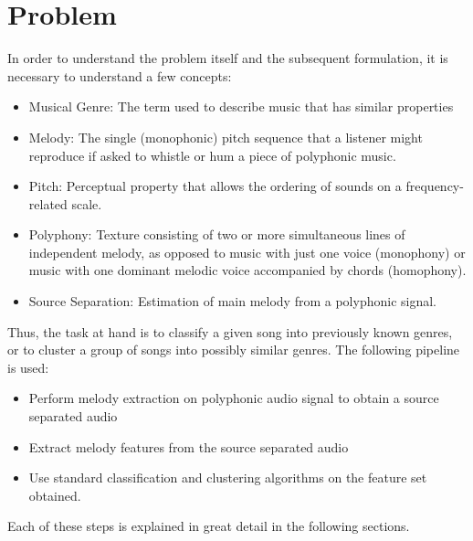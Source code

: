 \documentclass[12pt,journal,compsoc]{IEEEtran}
\begin{document}
\section{Problem}

In order to understand the problem itself and the subsequent formulation, it is necessary to understand a few concepts:
\begin{itemize}
\item Musical Genre: The term used to describe music that has similar properties
\item Melody: The single (monophonic) pitch sequence that a listener might reproduce if asked to whistle or hum a piece of polyphonic music.
\item Pitch: Perceptual property that allows the ordering of sounds on a frequency-related scale.
\item Polyphony: Texture consisting of two or more simultaneous lines of independent melody, as opposed to music with just one voice (monophony) or music with one dominant melodic voice accompanied by chords (homophony).
\item Source Separation: Estimation of main melody from a polyphonic signal.
\end{itemize}

Thus, the task at hand is to classify a given song into previously known genres, or to cluster a group of songs into possibly similar genres. The following pipeline is used:
\begin{itemize}
\item Perform melody extraction on polyphonic audio signal to obtain a source separated audio
\item Extract melody features from the source separated audio
\item Use standard classification and clustering algorithms on the feature set obtained.
\end{itemize}

Each of these steps is explained in great detail in the following sections.



\end{document}
